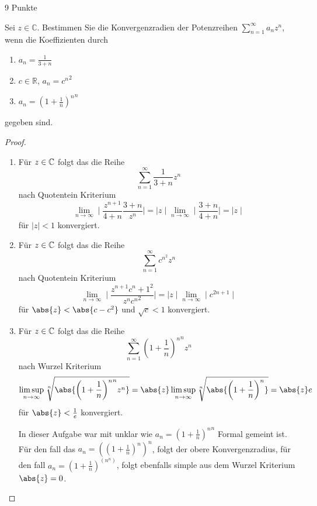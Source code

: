 \documentclass{problemset}
\begin{document}
\begin{problem}[Konvergenzradien]{9 Punkte}

Sei $z \in \mathbb{C}$. Bestimmen Sie die Konvergenzradien der Potenzreihen
$\sum\limits_{n=1}^{\infty} a_n z^n$, wenn die Koeffizienten durch
\begin{enumerate}
    \item $a_n = \frac{1}{3 + n}$
    \item $c \in \mathbb{R}$, $a_n = {c^n}^2$
    \item $a_n = {\left(1 + \frac{1}{n}\right)^n}^n$
\end{enumerate}
gegeben sind.

\begin{proof}
    \leavevmode
    \begin{enumerate}
        \item Für \(z \in \mathbb{C}\) folgt das die Reihe \[
                  \sum_{n=1}^{\infty} \frac{1}{3 + n} z^n
              \] nach Quotentein Kriterium \[
                  \lim_{n \to \infty} \mid \frac{z^{n+1}}{4+n}\frac{3 + n}{z^n} \mid = \mid z \mid \lim_{n \to \infty} \mid \frac{3+n}{4+n} \mid = \mid z \mid
              \] für \(\mid z \mid < 1\) konvergiert.

        \item Für \(z \in \mathbb{C}\) folgt das die Reihe \[
                  \sum_{n=1}^{\infty} c^{n^2} z^n
              \] nach Quotentein Kriterium \[
                  \lim_{n \to \infty} \mid \frac{z^{n+1} {c^n+1}^2}{z^n {c^n}^2} \mid = \mid z \mid \lim_{n \to \infty} \mid c^{2n+1} \mid
              \] für \(\abs{z} < \abs{c-c^2}\) und \(\sqrt{c} < 1\) konvergiert.

        \item Für \(z \in \mathbb{C}\) folgt das die Reihe \[
                  \sum_{n=1}^{\infty} {\left(1 + \frac{1}{n}\right)^n}^n z^n
              \] nach Wurzel Kriterium \[
                  \limsup_{n \to \infty} \sqrt[n]{\abs{{{\left(1 + \frac{1}{n}\right)}^n}^n z^n}} = \abs{z} \limsup_{n \to \infty} \sqrt[n]{\abs{{\left(1 + \frac{1}{n}\right)}^n}} = \abs{z} e
              \] für \(\abs{z} < \frac{1}{e}\) konvergiert.

              In dieser Aufgabe war mit unklar wie $a_n = {\left(1 + \frac{1}{n}\right)^n}^n$
              Formal gemeint ist. Für den fall das \(a_n = {({\left(1 +
                      \frac{1}{n}\right)^n})}^n\), folgt der obere Konvergenzradius, für den fall
              \(a_n = {\left(1 + \frac{1}{n}\right)}^{(n^n)}\), folgt ebenfalls simple aus
              dem Wurzel Kriterium \(\abs{z} = 0\).
    \end{enumerate}

\end{proof}
\end{problem}
\end{document}
